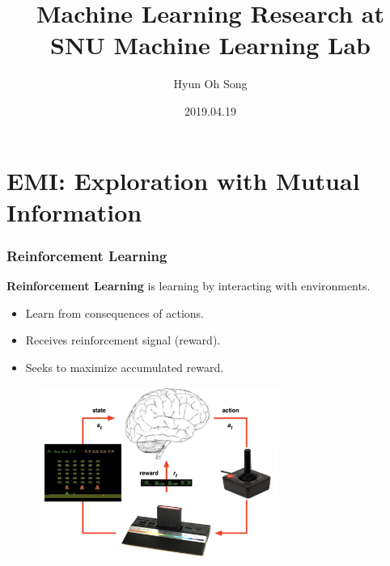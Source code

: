 \documentclass[10pt,mathserif]{beamer}
\title{Machine Learning Research at SNU Machine Learning Lab}
\author{Hyun Oh Song}
\institute
    {Seoul National University}
\date{2019.04.19}
\begin{document}
\begin{frame}
  \titlepage
\end{frame}

\section{EMI: Exploration with Mutual Information}

\begin{frame}
\frametitle{Reinforcement Learning}
  \textbf{Reinforcement Learning} is learning by interacting with environments.

  \begin{itemize} \itemsep=6pt
      \item Learn from consequences of actions.
      \item Receives reinforcement signal (reward).
      \item Seeks to maximize accumulated reward.
  \end{itemize}
  \begin{figure}[h]
        \centering
          \includegraphics[width=0.7\textwidth]{emi_figures/mk_intro}
  \end{figure}
\end{frame}

\end{document}
